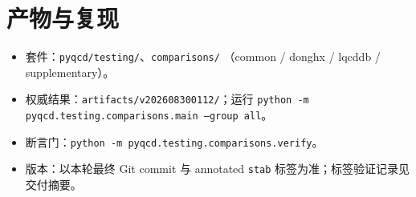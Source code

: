 \documentclass[10.5pt]{ctexart}
\begin{document}
\section{产物与复现}
\begin{itemize}
\item 套件：\texttt{pyqcd/testing/}、\texttt{comparisons/}
     （common / donghx / lqcddb / supplementary）。
\item 权威结果：\texttt{artifacts/v202608300112/}；运行
      \texttt{python -m pyqcd.testing.comparisons.main --group all}。
\item 断言门：\texttt{python -m pyqcd.testing.comparisons.verify}。
\item 版本：以本轮最终 Git commit 与 annotated \verb|stab| 标签为准；标签验证记录见交付摘要。
\end{itemize}
\end{document}

